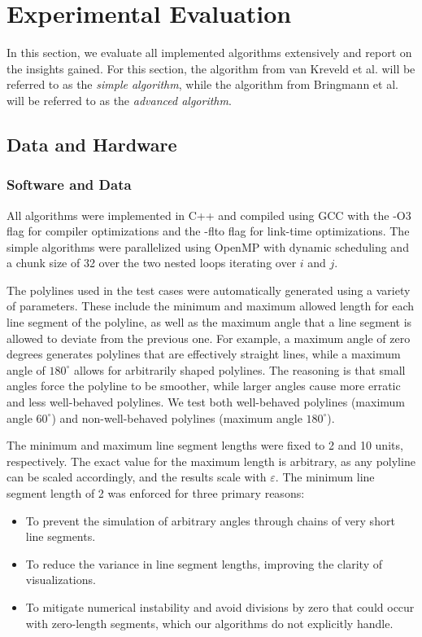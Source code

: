 \section{Experimental Evaluation}
\label{sec:evaluation}

In this section, we evaluate all implemented algorithms extensively and report on the insights gained. For this section, the algorithm from van Kreveld et al. will be referred to as the \emph{simple algorithm}, while the algorithm from Bringmann et al. will be referred to as the \emph{advanced algorithm}.

\subsection{Data and Hardware}
\label{subsec:hardware}

\subsubsection{Software and Data}
\label{subsubsec:software}

All algorithms were implemented in C++ and compiled using GCC with the -O3 flag for compiler optimizations and the -flto flag for link-time optimizations. The simple algorithms were parallelized using OpenMP with dynamic scheduling and a chunk size of 32 over the two nested loops iterating over \(i\) and \(j\).

The polylines used in the test cases were automatically generated using a variety of parameters. These include the minimum and maximum allowed length for each line segment of the polyline, as well as the maximum angle that a line segment is allowed to deviate from the previous one. For example, a maximum angle of zero degrees generates polylines that are effectively straight lines, while a maximum angle of \(180^\circ\) allows for arbitrarily shaped polylines. The reasoning is that small angles force the polyline to be smoother, while larger angles cause more erratic and less well-behaved polylines. We test both well-behaved polylines (maximum angle \(60^\circ\)) and non-well-behaved polylines (maximum angle \(180^\circ\)).

The minimum and maximum line segment lengths were fixed to 2 and 10 units, respectively. The exact value for the maximum length is arbitrary, as any polyline can be scaled accordingly, and the results scale with \(\varepsilon\). The minimum line segment length of 2 was enforced for three primary reasons:
\begin{itemize}
	\item To prevent the simulation of arbitrary angles through chains of very short line segments.
	\item To reduce the variance in line segment lengths, improving the clarity of visualizations.
	\item To mitigate numerical instability and avoid divisions by zero that could occur with zero-length segments, which our algorithms do not explicitly handle.
\end{itemize}

